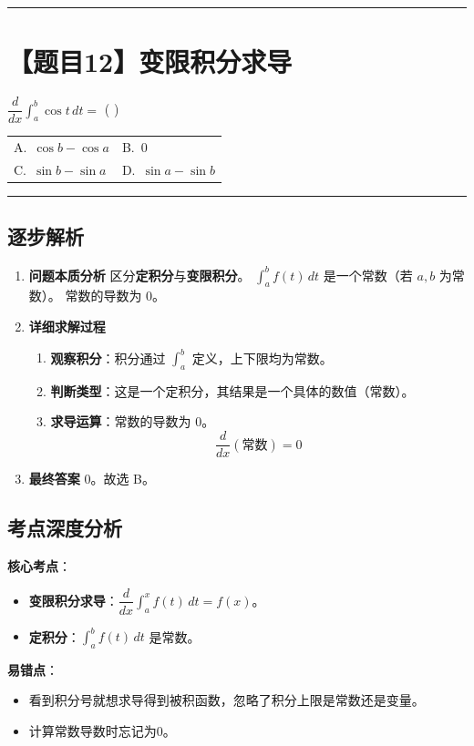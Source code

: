 \documentclass[UTF8,10pt]{ctexart}
\makeatletter
\newenvironment{redenv}{\color{red}}{}
\newenvironment{detailedanalysis}{%
    \color{red}
    \begin{enumerate}[label=\textbf{第\arabic*步：}, leftmargin=*, align=left, itemsep=0pt, parsep=0pt, topsep=0pt, partopsep=0pt]
}{%
    \end{enumerate}
}
\newenvironment{conceptbox}{%
    \begin{tcolorbox}[colback=red!5, colframe=red!50!black, title=概念解析, fonttitle=\bfseries, top=2pt, bottom=2pt, left=2pt, right=2pt]
}{%
    \end{tcolorbox}
}
\newcommand{\problemrule}{\par\filbreak\noindent\rule{\textwidth}{1.5pt}\vspace{-0.5em}}
\newcommand{\analysisrule}{\noindent\rule{\textwidth}{0.8pt}\vspace{-0.5em}}
\newcommand{\twochoices}[4]{
    \par\noindent
    \begin{tabular*}{\linewidth}{@{\extracolsep{\fill}}ll}
        A.~#1 & B.~#2 \\
        C.~#3 & D.~#4
    \end{tabular*}
}
\makeatother
\begin{document}
\problemrule
\section*{【题目12】变限积分求导}
$\dfrac{d}{dx} \int_a^b \cos t \, dt = $ ( \quad )
\twochoices{$\cos b - \cos a$}{0}{$\sin b - \sin a$}{$\sin a - \sin b$}

\begin{redenv}
\analysisrule
\subsection*{逐步解析}

\begin{detailedanalysis}
\item \textbf{问题本质分析}
区分\textbf{定积分}与\textbf{变限积分}。
$\int_a^b f(t)\, dt$ 是一个常数（若 $a,b$ 为常数）。
常数的导数为 0。

\item \textbf{详细求解过程}
\begin{enumerate}[label=(\alph*)]
    \item \textbf{观察积分}：积分通过 $\int_a^b$ 定义，上下限均为常数。
    \item \textbf{判断类型}：这是一个定积分，其结果是一个具体的数值（常数）。
    \item \textbf{求导运算}：常数的导数为 0。
    \[ \dfrac{d}{dx} (\text{常数}) = 0 \]
\end{enumerate}

\item \textbf{最终答案}
0。故选 B。
\end{detailedanalysis}

\subsection*{考点深度分析}
\begin{conceptbox}
\textbf{核心考点}：
\begin{itemize}
    \item \textbf{变限积分求导}：$\dfrac{d}{dx} \int_a^x f(t)\, dt = f(x)$。
    \item \textbf{定积分}：$\int_a^b f(t)\, dt$ 是常数。
\end{itemize}
\textbf{易错点}：
\begin{itemize}
    \item 看到积分号就想求导得到被积函数，忽略了积分上限是常数还是变量。
    \item 计算常数导数时忘记为0。
\end{itemize}
\end{conceptbox}
\end{redenv}
\end{document}
